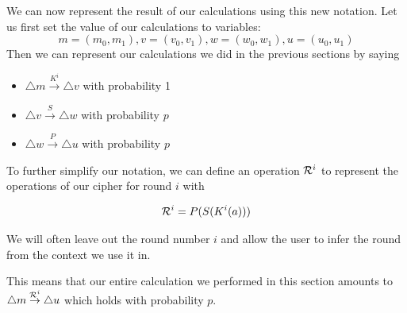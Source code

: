 \documentclass[12pt,a4paper]{article}
\newcommand{\differ}[1] {\overset{#1}{\rightarrow}}
\begin{document}
We can now represent the result of our calculations using this new notation.
Let us first set the value of our calculations to variables:
\[m = (m_0, m_1), v = (v_0, v_1), w = (w_0,w_1), u = (u_0,u_1)\]
Then we can represent our calculations we did in the previous sections by saying 

\begin{itemize}
\item $\triangle m \differ{K^i} \triangle v$ with probability 1
\item $\triangle v \differ{S} \triangle w$ with probability $p$
\item $\triangle w \differ{P} \triangle u$ with probability $p$
\end{itemize}

To further simplify our notation, we can define an operation ${\cal{R}}^i$ to
represent the operations of our cipher for round $i$ with

\[{\cal{R}}^i = P(S(K^i(a)))\]

We will often leave out the round number $i$ and allow the user to
infer the round from the context we use it in.

This means that our entire calculation we performed in this section amounts to
$\triangle m \differ{{\cal{R}}^i} \triangle u$ which holds with probability $p$. 
\end{document}
